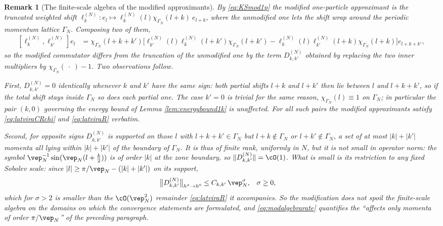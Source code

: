 \documentclass[a4paper, 11pt]{article}
\DeclareMathOperator{\1}{\mathds{1}}
\newtheorem{rem}[thm]{Remark}
\begin{document}
\begin{rem}[The finite-scale algebra of the modified approximants]
\label{rem:modalgebra}
By \eqref{eq:KSmod1p} the modified one-particle approximant is the \emph{truncated} weighted shift $\ell^{(N)}_{k}: e_{l}\mapsto\ell^{(N)}_{k}(l)\chi_{\Gamma_{N}}(l+k)\!\ e_{l+k}$, where the unmodified one lets the shift wrap around the periodic momentum lattice $\Gamma_{N}$. Composing two of them,
\begin{align}
\label{eq:modcommutator}
[\ell^{(N)}_{k},\ell^{(N)}_{k'}]e_{l} & = \chi_{\Gamma_{N}}(l\!+\!k\!+\!k')\big[\ell^{(N)}_{k'}(l)\ell^{(N)}_{k}(l\!+\!k')\chi_{\Gamma_{N}}(l\!+\!k')-\ell^{(N)}_{k}(l)\ell^{(N)}_{k'}(l\!+\!k)\chi_{\Gamma_{N}}(l\!+\!k)\big]e_{l+k+k'},
\end{align}
so the modified commutator differs from the truncation of the unmodified one by the term $D^{(N)}_{k,k'}$ obtained by replacing the two inner multipliers by $\chi_{\Gamma_{N}}(\!\ \cdot\!\ )-1$. Two observations follow.

First, $D^{(N)}_{k,k'}=0$ \emph{identically} whenever $k$ and $k'$ have the same sign: both partial shifts $l+k$ and $l+k'$ then lie between $l$ and $l+k+k'$, so if the total shift stays inside $\Gamma_{N}$ so does each partial one. The case $k'=0$ is trivial for the same reason, $\chi_{\Gamma_{N}}(l)\equiv1$ on $\Gamma_{N}$; in particular the pair $(k,0)$ governing the energy bound of Lemma \ref{lem:energybound1k} is unaffected. For all such pairs the modified approximants satisfy \eqref{eq:latviraCRchi} and \eqref{eq:latviraR} verbatim.

Second, for opposite signs $D^{(N)}_{k,k'}$ is supported on those $l$ with $l+k+k'\in\Gamma_{N}$ but $l+k\notin\Gamma_{N}$ or $l+k'\notin\Gamma_{N}$, a set of at most $|k|+|k'|$ momenta all lying within $|k|+|k'|$ of the boundary of $\Gamma_{N}$. It is thus of finite rank, uniformly in $N$, but it is \emph{not} small in operator norm: the symbol $\vep_{N}^{-1}\sin(\vep_{N}(l+\tfrac{k}{2}))$ is of order $|k|$ at the zone boundary, so $\|D^{(N)}_{k,k'}\|=\cO(1)$. What is small is its restriction to any fixed Sobolev scale: since $|l|\geq\pi/\vep_{N}-(|k|+|k'|)$ on its support,
\begin{align}
\label{eq:modalgebrarate}
\big\|D^{(N)}_{k,k'}\big\|_{h^{\sigma}\rightarrow h^{0}} & \leq C_{k,k'}\!\ \vep_{N}^{\sigma}, & \sigma & \geq0,
\end{align}
which for $\sigma>2$ is smaller than the $\cO(\vep_{N}^{2})$ remainder \eqref{eq:latviraR} it accompanies. So the modification does not spoil the finite-scale algebra on the domains on which the convergence statements are formulated, and \eqref{eq:modalgebrarate} quantifies the ``affects only momenta of order $\pi/\vep_{N}$'' of the preceding paragraph.
\end{rem}
\end{document}
